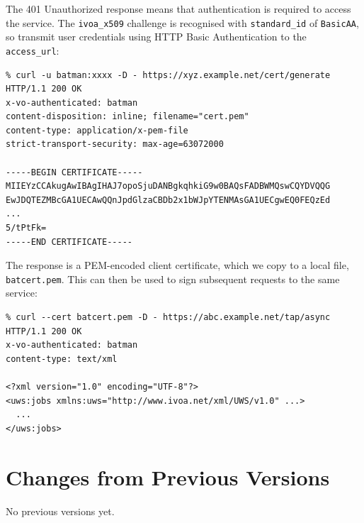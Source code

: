 \documentclass[11pt,a4paper]{ivoa}
\begin{document}
\noindent
The 401 Unauthorized response means that authentication
is required to access the service.
The \verb|ivoa_x509| challenge is recognised with \verb|standard_id|
of \verb|BasicAA|, so transmit user credentials using
HTTP Basic Authentication to the \verb|access_url|:

{\footnotesize
\begin{verbatim}
% curl -u batman:xxxx -D - https://xyz.example.net/cert/generate
HTTP/1.1 200 OK
x-vo-authenticated: batman
content-disposition: inline; filename="cert.pem"
content-type: application/x-pem-file
strict-transport-security: max-age=63072000

-----BEGIN CERTIFICATE-----
MIIEYzCCAkugAwIBAgIHAJ7opoSjuDANBgkqhkiG9w0BAQsFADBWMQswCQYDVQQG
EwJDQTEZMBcGA1UECAwQQnJpdGlzaCBDb2x1bWJpYTENMAsGA1UECgwEQ0FEQzEd
...
5/tPtFk=
-----END CERTIFICATE-----
\end{verbatim}
}

\noindent
The response is a PEM-encoded client certificate, which we copy
to a local file, \verb|batcert.pem|.
This can then be used to sign subsequent requests to the same service:
{\footnotesize
\begin{verbatim}
% curl --cert batcert.pem -D - https://abc.example.net/tap/async
HTTP/1.1 200 OK
x-vo-authenticated: batman
content-type: text/xml

<?xml version="1.0" encoding="UTF-8"?>
<uws:jobs xmlns:uws="http://www.ivoa.net/xml/UWS/v1.0" ...>
  ...
</uws:jobs>
\end{verbatim}
}



\appendix
\section{Changes from Previous Versions}

No previous versions yet.



\end{document}

